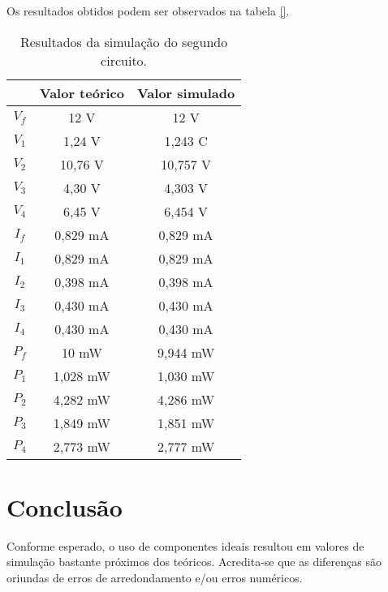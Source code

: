\documentclass[a4paper]{report}
\begin{document}
Os resultados obtidos podem ser observados na tabela \ref{}.

\begin{table}[h]
    \centering
    \caption{Resultados da simulação do segundo circuito.}
    \label{tab:circ-2}
    \begin{tabular}{c | c | c}
     & Valor teórico & Valor simulado \\
     \hline
	$V_f$ & 12 V & 12 V \\
	$V_1$ & 1,24 V & 1,243 C \\
	$V_2$ & 10,76 V & 10,757 V \\
	$V_3$ & 4,30 V & 4,303 V \\
	$V_4$ & 6,45 V & 6,454 V \\
	$I_f$ & 0,829 mA & 0,829 mA \\
	$I_1$ & 0,829 mA & 0,829 mA \\
	$I_2$ & 0,398 mA & 0,398 mA \\
	$I_3$ & 0,430 mA & 0,430 mA \\
	$I_4$ & 0,430 mA & 0,430 mA \\
	$P_f$ & 10 mW & 9,944 mW \\
	$P_1$ & 1,028 mW & 1,030 mW \\
	$P_2$ & 4,282 mW & 4,286 mW \\
	$P_3$ & 1,849 mW & 1,851 mW \\
	$P_4$ & 2,773 mW & 2,777 mW \\
    \end{tabular}
\end{table}

\section*{Conclusão}

Conforme esperado, o uso de componentes ideais resultou em valores de simulação bastante próximos dos teóricos. Acredita-se que as diferenças são oriundas de erros de arredondamento e/ou erros numéricos.
\end{document}
